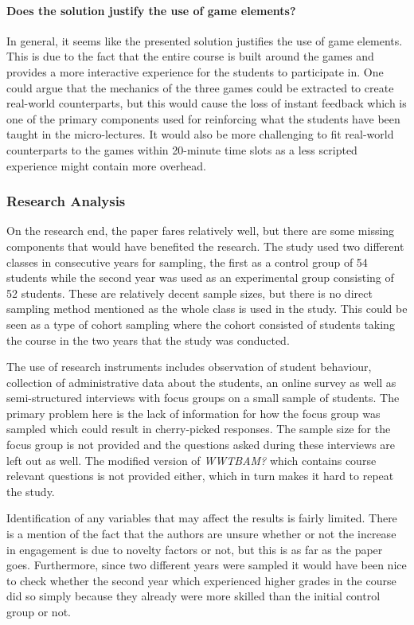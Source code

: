 \paragraph{Does the solution justify the use of game elements?}
In general, it seems like the presented solution justifies the use of game elements. This is due to the fact that the entire course is built around the games and provides a more interactive experience for the students to participate in. One could argue that the mechanics of the three games could be extracted to create real-world counterparts, but this would cause the loss of instant feedback which is one of the primary components used for reinforcing what the students have been taught in the micro-lectures. It would also be more challenging to fit real-world counterparts to the games within 20-minute time slots as a less scripted experience might contain more overhead. 

\subsubsection{Research Analysis}
On the research end, the paper fares relatively well, but there are some missing components that would have benefited the research. 
The study used two different classes in consecutive years for sampling, the first as a control group of 54 students while the second year was used as an experimental group consisting of 52 students. These are relatively decent sample sizes, but there is no direct sampling method mentioned as the whole class is used in the study. This could be seen as a type of cohort sampling where the cohort consisted of students taking the course in the two years that the study was conducted. 

The use of research instruments includes observation of student behaviour, collection of administrative data about the students, an online survey as well as semi-structured interviews with focus groups on a small sample of students. The primary problem here is the lack of information for how the focus group was sampled which could result in cherry-picked responses. The sample size for the focus group is not provided and the questions asked during these interviews are left out as well. The modified version of \emph{WWTBAM?} which contains course relevant questions is not provided either, which in turn makes it hard to repeat the study. 

Identification of any variables that may affect the results is fairly limited. There is a mention of the fact that the authors are unsure whether or not the increase in engagement is due to novelty factors or not, but this is as far as the paper goes. Furthermore, since two different years were sampled it would have been nice to check whether the second year which experienced higher grades in the course did so simply because they already were more skilled than the initial control group or not. 

